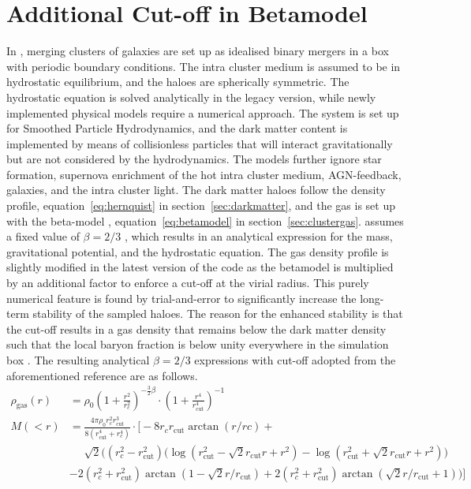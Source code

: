 \documentclass[MScProj_TLRH_ClusterEnergy.tex]{subfiles}
\begin{document}
\section*{Additional Cut-off in Betamodel}

In , merging clusters of galaxies are set up as idealised binary
mergers in a box with periodic boundary conditions. The intra cluster medium is
assumed to be in hydrostatic equilibrium, and the haloes are spherically symmetric.
The hydrostatic equation is solved analytically in the legacy version, while newly
implemented physical models require a numerical approach. The system is set up 
for Smoothed Particle Hydrodynamics, and the dark matter content is implemented
by means of collisionless particles that will interact gravitationally but are 
not considered by the hydrodynamics. The models further ignore star formation, 
supernova enrichment of the hot intra cluster medium, AGN-feedback, galaxies,
and the intra cluster light. The dark matter haloes follow the
\citet{1990ApJ...356..359H} density profile, equation~\eqref{eq:hernquist} in
section~\ref{sec:darkmatter}, and the gas is set up with the beta-model 
\citep{1978A&A....70..677C}, equation~\eqref{eq:betamodel} in 
section~\ref{sec:clustergas}. \citet{2014MNRAS.438.1971D} assumes a fixed value
of $\beta = 2/3$ \citep{2008MNRAS.389..967M}, which results in an analytical 
expression for the mass, gravitational potential, and the hydrostatic equation.
The gas density profile is slightly modified in the latest version of the code 
as the betamodel is multiplied by an additional factor to enforce a cut-off
at the virial radius. This purely numerical feature is found by trial-and-error
to significantly increase the long-term stability of the sampled haloes. The 
reason for the enhanced stability is that the cut-off results in a gas density 
that remains below the dark matter density such that the local baryon fraction
is below unity everywhere in the simulation box \citep[in prep]{2016MNRAS.000.000D}.
The resulting analytical $\beta = 2/3$ expressions with cut-off adopted from 
the aforementioned reference are as follows.
\begin{align}
    \rho_{\text{gas}} (r) &= \rho_0
        \left( 1 + \frac{r^2}{r_c^2} \right)^{-\frac{3}{2}\beta} \cdot
        \left( 1 + \frac{r^4}{r_{\text{cut}}^4} \right)^{-1} \label{eq:betamodel_cut}  \\
    M(<r) &= \frac{4 \pi \rho_0 r_c^2 r_{\text{cut}}^3}{8( r_{\text{cut}}^4+r_c^4)} \cdot \Bigg[ - 8  r_c  r_{\text{cut}}  \arctan(r/rc) + \nonumber \\
&\phantom{{}={}} \sqrt{2} \bigg( (r_c^2-r_{\text{cut}}^2) \Big( \log(r_{\text{cut}}^2 - \sqrt{2}r_{\text{cut}}r+r^2) 
- \log(r_{\text{cut}}^2 + \sqrt{2}r_{\text{cut}}r+r^2)\Big) \nonumber \\
&- 2  (r_c^2 + r_{\text{cut}}^2)  \arctan(1 - \sqrt{2}r/r_{\text{cut}}) 
+ 2  (r_c^2 + r_{\text{cut}}^2)  \arctan(\sqrt{2}  r/r_{\text{cut}} + 1)\bigg) \Bigg] \label{eq:gasmass_cut}
\end{align}
\end{document}
